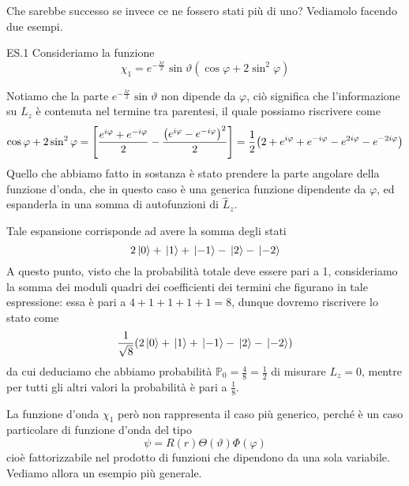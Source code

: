 \begin{soluzione}
   \vspace{0.2cm}Che sarebbe successo se invece ce ne fossero stati più di uno? Vediamolo facendo due esempi.
   
   \vspace{0.2cm}ES.1 Consideriamo la funzione
   \begin{equation*}
      \chi_1=e^{-\frac{\lambda r}{2}}\sin{\vartheta}( \cos{\varphi} + 2 \sin^2{\varphi} )
   \end{equation*}
   
   Notiamo che la parte $e^{-\frac{\lambda r}{2}}\sin{\vartheta}$ non dipende da $\varphi$, ciò significa che l'informazione su $L_z$ è contenuta nel termine tra parentesi, il quale possiamo riscrivere come
   \begin{equation*}
      \cos{\varphi} + 2 \sin^2{\varphi}
      =\qty[ \frac{e^{i\varphi} + e^{-i\varphi}}{2} - \frac{\qty( e^{i\varphi} - e^{-i\varphi} )^2}{2} ]
      =\frac{1}{2} \qty( 2 + e^{i\varphi} + e^{-i\varphi} - e^{2i\varphi} - e^{-2i\varphi} )
   \end{equation*}
   Quello che abbiamo fatto in sostanza è stato prendere la parte angolare della funzione d'onda, che in questo caso è una generica funzione dipendente da $\varphi$, ed espanderla in una somma di autofunzioni di $\hat{L}_z$.
   
   Tale espansione corrisponde ad avere la somma degli stati
   \begin{equation*}
      2\ket*{0} + \ket*{1} + \ket*{-1} - \ket*{2} - \ket*{-2}
   \end{equation*}
   A questo punto, visto che la probabilità totale deve essere pari a 1, consideriamo la somma dei moduli quadri dei coefficienti dei termini che figurano in tale espressione: essa è pari a $4 + 1 + 1 + 1 +1=8$, dunque dovremo riscrivere lo stato come
   \begin{equation*}
      \frac{1}{\sqrt{8}}\qty( 2\ket*{0} + \ket*{1} + \ket*{-1} - \ket*{2} - \ket*{-2} )
   \end{equation*}
   da cui deduciamo che abbiamo probabilità $\mathbb{P}_0=\frac{4}{8}=\frac{1}{2}$ di misurare $L_z=0$, mentre per tutti gli altri valori la probabilità è pari a $\frac{1}{8}$.
   
   La funzione d'onda $\chi_1$ però non rappresenta il caso più generico, perché è un caso particolare di funzione d'onda del tipo
   \begin{equation*}
      \psi=R(r)\Theta(\vartheta)\Phi(\varphi)
   \end{equation*}
   cioè fattorizzabile nel prodotto di funzioni che dipendono da una sola variabile. Vediamo allora un esempio più generale.


\end{soluzione}

